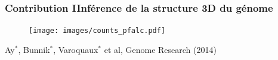 \documentclass[11pt,xcolor=dvipsnames]{beamer}
\begin{document}
\begin{frame}
\frametitle{Contribution I\quad Inférence de la structure 3D du génome}

\begin{figure}
\centering
\texttt{[image: images/counts\_pfalc.pdf]}
\end{figure}
\begin{flushright}
\tiny Ay$^*$, Bunnik$^*$, {\color{red} Varoquaux$^*$} et
al, Genome Research (2014)
\end{flushright}


\begin{overlayarea}{12cm}{4cm}
\end{overlayarea}
\end{frame}
\end{document}
